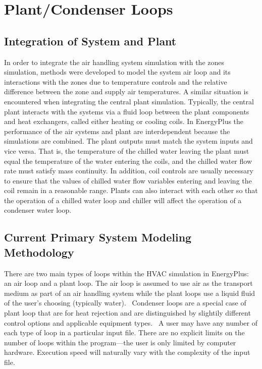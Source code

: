 \section{Plant/Condenser Loops}\label{plantcondenser-loops}

\subsection{Integration of System and Plant}\label{integration-of-system-and-plant}

In order to integrate the air handling system simulation with the zones simulation, methods were developed to model the system air loop and its interactions with the zones due to temperature controls and the relative difference between the zone and supply air temperatures. A similar situation is encountered when integrating the central plant simulation. Typically, the central plant interacts with the systems via a fluid loop between the plant components and heat exchangers, called either heating or cooling coils. In EnergyPlus the performance of the air systems and plant are interdependent because the simulations are combined. The plant outputs must match the system inputs and vice versa. That is, the temperature of the chilled water leaving the plant must equal the temperature of the water entering the coils, and the chilled water flow rate must satisfy mass continuity. In addition, coil controls are usually necessary to ensure that the values of chilled water flow variables entering and leaving the coil remain in a reasonable range. Plants can also interact with each other so that the operation of a chilled water loop and chiller will affect the operation of a condenser water loop.

\subsection{Current Primary System Modeling Methodology}\label{current-primary-system-modeling-methodology}

There are two main types of loops within the HVAC simulation in EnergyPlus: an air loop and a plant loop. The air loop is assumed to use air as the transport medium as part of an air handling system while the plant loops use a liquid fluid of the user's choosing (typically water).~ Condenser loops are a special case of plant loop that are for heat rejection and are distinguished by slightily different control options and applicable equipment types.~ A user may have any number of each type of loop in a particular input file. There are no explicit limits on the number of loops within the program---the user is only limited by computer hardware. Execution speed will naturally vary with the complexity of the input file.

